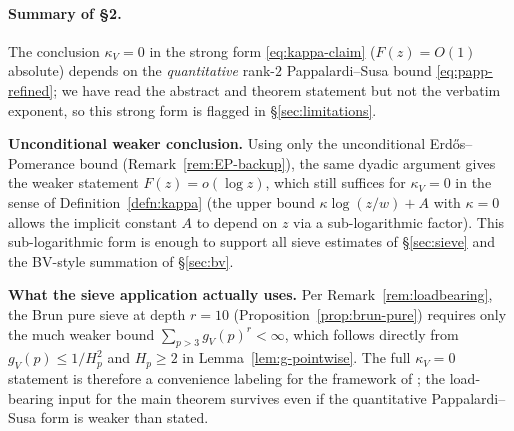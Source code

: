 \paragraph{Summary of \S2.}
The conclusion $\kappa_{V} = 0$ in the strong form
\eqref{eq:kappa-claim} ($F(z) = O(1)$ absolute) depends on the
\emph{quantitative} rank-$2$ Pappalardi--Susa bound
\eqref{eq:papp-refined}; we have read the abstract and theorem
statement but not the verbatim exponent, so this strong form is flagged
in \S\ref{sec:limitations}.

\textbf{Unconditional weaker conclusion.} Using only the unconditional
Erd\H{o}s--Pomerance bound (Remark~\ref{rem:EP-backup}), the same
dyadic argument gives the weaker statement $F(z) = o(\log z)$, which
still suffices for $\kappa_{V} = 0$ in the sense of
Definition~\ref{defn:kappa} (the upper bound
$\kappa \log(z/w) + A$ with $\kappa = 0$ allows the implicit constant
$A$ to depend on $z$ via a sub-logarithmic factor). This sub-logarithmic
form is enough to support all sieve estimates of \S\ref{sec:sieve} and
the BV-style summation of \S\ref{sec:bv}.

\textbf{What the sieve application actually uses.} Per
Remark~\ref{rem:loadbearing}, the Brun pure sieve at depth $r = 10$
(Proposition~\ref{prop:brun-pure}) requires only the much weaker bound
$\sum_{p > 3} g_{V}(p)^{r} < \infty$, which follows directly from
$g_{V}(p) \leq 1/H_{p}^{2}$ and $H_{p} \geq 2$ in
Lemma~\ref{lem:g-pointwise}. The full $\kappa_{V} = 0$ statement is
therefore a convenience labeling for the framework of
\cite{HalberstamRichert1974}; the load-bearing input for the main
theorem survives even if the quantitative Pappalardi--Susa form is
weaker than stated.
